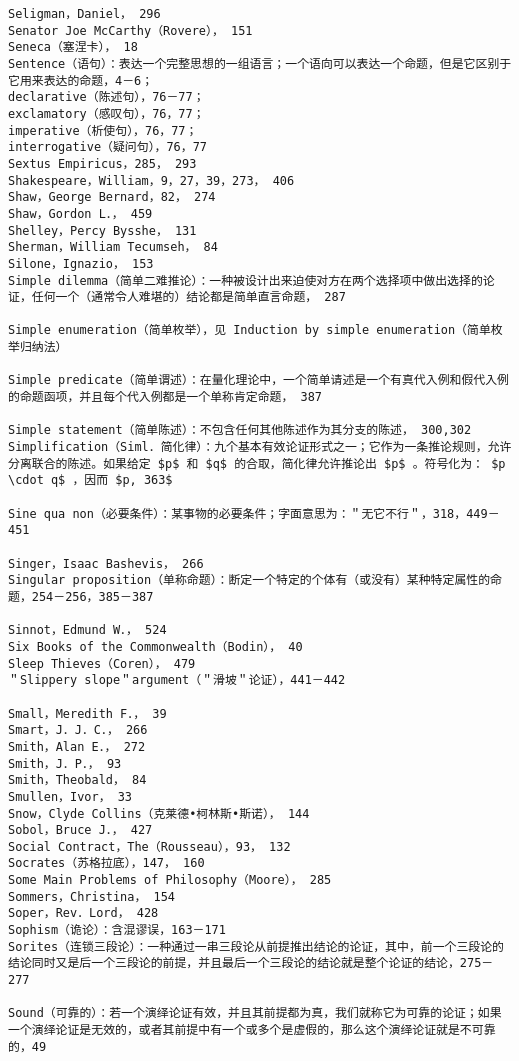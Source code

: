 \begin{verbatim}
Seligman，Daniel， 296
Senator Joe McCarthy（Rovere）， 151
Seneca（塞涅卡）， 18
Sentence（语句）：表达一个完整思想的一组语言；一个语向可以表达一个命题，但是它区别于它用来表达的命题，4－6；
declarative（陈述句），76－77；
exclamatory（感叹句），76，77；
imperative（析使句），76，77；
interrogative（疑问句），76，77
Sextus Empiricus，285， 293
Shakespeare，William，9，27，39，273， 406
Shaw，George Bernard，82， 274
Shaw，Gordon L．， 459
Shelley，Percy Bysshe， 131
Sherman，William Tecumseh， 84
Silone，Ignazio， 153
Simple dilemma（简单二难推论）：一种被设计出来迫使对方在两个选择项中做出选择的论证，任何一个（通常令人难堪的）结论都是简单直言命题， 287

Simple enumeration（简单枚举），见 Induction by simple enumeration（简单枚举归纳法）

Simple predicate（简单谓述）：在量化理论中，一个简单请述是一个有真代入例和假代入例的命题函项，并且每个代入例都是一个单称肯定命题， 387

Simple statement（简单陈述）：不包含任何其他陈述作为其分支的陈述， 300,302
Simplification（Siml．简化律）：九个基本有效论证形式之一；它作为一条推论规则，允许分离联合的陈述。如果给定 $p$ 和 $q$ 的合取，简化律允许推论出 $p$ 。符号化为： $p \cdot q$ ，因而 $p, 363$

Sine qua non（必要条件）：某事物的必要条件；字面意思为：＂无它不行＂，318，449－ 451

Singer，Isaac Bashevis， 266
Singular proposition（单称命题）：断定一个特定的个体有（或没有）某种特定属性的命题，254－256，385－387

Sinnot，Edmund W．， 524
Six Books of the Commonwealth（Bodin）， 40
Sleep Thieves（Coren）， 479
＂Slippery slope＂argument（＂滑坡＂论证），441－442

Small，Meredith F．， 39
Smart，J．J．C．， 266
Smith，Alan E．， 272
Smith，J．P．， 93
Smith，Theobald， 84
Smullen，Ivor， 33
Snow，Clyde Collins（克莱德•柯林斯•斯诺）， 144
Sobol，Bruce J．， 427
Social Contract，The（Rousseau），93， 132
Socrates（苏格拉底），147， 160
Some Main Problems of Philosophy（Moore）， 285
Sommers，Christina， 154
Soper，Rev．Lord， 428
Sophism（诡论）：含混谬误，163－171
Sorites（连锁三段论）：一种通过一串三段论从前提推出结论的论证，其中，前一个三段论的结论同时又是后一个三段论的前提，并且最后一个三段论的结论就是整个论证的结论，275－277

Sound（可靠的）：若一个演绎论证有效，并且其前提都为真，我们就称它为可靠的论证；如果一个演绎论证是无效的，或者其前提中有一个或多个是虚假的，那么这个演绎论证就是不可靠的，49


\end{verbatim}
